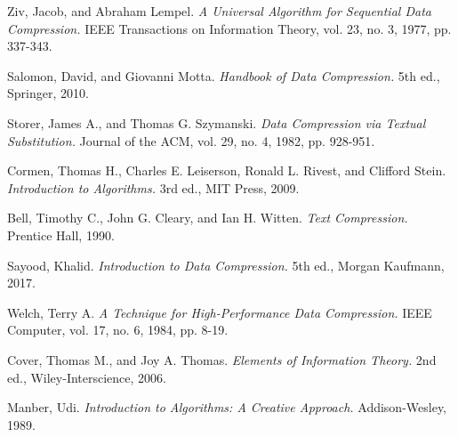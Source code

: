 \newpage
\begin{thebibliography}{99}
    Ziv, Jacob, and Abraham Lempel. {\itshape A Universal Algorithm for Sequential Data Compression.} IEEE Transactions on Information Theory, vol. 23, no. 3, 1977, pp. 337-343.

    Salomon, David, and Giovanni Motta. {\itshape Handbook of Data Compression.} 5th ed., Springer, 2010.

    Storer, James A., and Thomas G. Szymanski. {\itshape Data Compression via Textual Substitution.} Journal of the ACM, vol. 29, no. 4, 1982, pp. 928-951.

    Cormen, Thomas H., Charles E. Leiserson, Ronald L. Rivest, and Clifford Stein. {\itshape Introduction to Algorithms.} 3rd ed., MIT Press, 2009.

    Bell, Timothy C., John G. Cleary, and Ian H. Witten. {\itshape Text Compression.} Prentice Hall, 1990.

    Sayood, Khalid. {\itshape Introduction to Data Compression.} 5th ed., Morgan Kaufmann, 2017.

    Welch, Terry A. {\itshape A Technique for High-Performance Data Compression.} IEEE Computer, vol. 17, no. 6, 1984, pp. 8-19.

    Cover, Thomas M., and Joy A. Thomas. {\itshape Elements of Information Theory.} 2nd ed., Wiley-Interscience, 2006.

    Manber, Udi. {\itshape Introduction to Algorithms: A Creative Approach.} Addison-Wesley, 1989.
\end{thebibliography}

